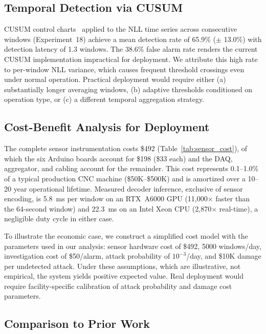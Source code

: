\subsection{Temporal Detection via CUSUM}
\label{sec:disc_cusum}

CUSUM control charts~\cite{page1954cusum} applied to the NLL time series across consecutive windows (Experiment~18) achieve a mean detection rate of 65.9\% ($\pm$ 13.0\%) with detection latency of 1.3 windows.
The 38.6\% false alarm rate renders the current CUSUM implementation impractical for deployment.
We attribute this high rate to per-window NLL variance, which causes frequent threshold crossings even under normal operation.
Practical deployment would require either (a) substantially longer averaging windows, (b) adaptive thresholds conditioned on operation type, or (c) a different temporal aggregation strategy.

\subsection{Cost-Benefit Analysis for Deployment}
\label{sec:disc_cost}

The complete sensor instrumentation costs \$492 (Table~\ref{tab:sensor_cost}), of which the six Arduino boards account for \$198 (\$33 each) and the DAQ, aggregator, and cabling account for the remainder.
This cost represents 0.1--1.0\% of a typical production CNC machine (\$50K--\$500K) and is amortized over a 10--20 year operational lifetime.
Measured decoder inference, exclusive of sensor encoding, is 5.8~ms per window on an RTX~A6000 GPU (11{,}000$\times$ faster than the 64-second window) and 22.3~ms on an Intel Xeon CPU (2{,}870$\times$ real-time), a negligible duty cycle in either case.

To illustrate the economic case, we construct a simplified cost model with the parameters used in our analysis: sensor hardware cost of \$492, 5000 windows/day, investigation cost of \$50/alarm, attack probability of $10^{-3}$/day, and \$10K damage per undetected attack.
Under these assumptions, which are illustrative, not empirical, the system yields positive expected value.
Real deployment would require facility-specific calibration of attack probability and damage cost parameters.

\subsection{Comparison to Prior Work}
\label{sec:disc_comparison}

